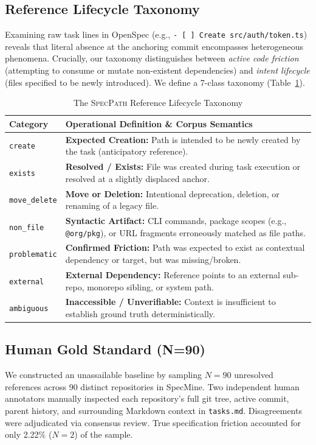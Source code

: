 \documentclass[10pt,conference]{IEEEtran}
\begin{document}
\subsection{Reference Lifecycle Taxonomy}
Examining raw task lines in OpenSpec (e.g., \texttt{- [ ] Create src/auth/token.ts}) reveals that literal absence at the anchoring commit encompasses heterogeneous phenomena. Crucially, our taxonomy distinguishes between \textit{active code friction} (attempting to consume or mutate non-existent dependencies) and \textit{intent lifecycle} (files specified to be newly introduced). We define a 7-class taxonomy (Table~\ref{tab:taxonomy}).

\begin{table}[t]
\caption{The \textsc{SpecPath} Reference Lifecycle Taxonomy}
\label{tab:taxonomy}
\centering
\scriptsize
\begin{tabular}{lp{5.4cm}}
\toprule
\textbf{Category} & \textbf{Operational Definition \& Corpus Semantics} \\
\midrule
\texttt{create} & \textbf{Expected Creation:} Path is intended to be newly created by the task (anticipatory reference). \\
\texttt{exists} & \textbf{Resolved / Exists:} File was created during task execution or resolved at a slightly displaced anchor. \\
\texttt{move\_delete} & \textbf{Move or Deletion:} Intentional deprecation, deletion, or renaming of a legacy file. \\
\texttt{non\_file} & \textbf{Syntactic Artifact:} CLI commands, package scopes (e.g., \texttt{@org/pkg}), or URL fragments erroneously matched as file paths. \\
\texttt{problematic} & \textbf{Confirmed Friction:} Path was expected to exist as contextual dependency or target, but was missing/broken. \\
\texttt{external} & \textbf{External Dependency:} Reference points to an external sub-repo, monorepo sibling, or system path. \\
\texttt{ambiguous} & \textbf{Inaccessible / Unverifiable:} Context is insufficient to establish ground truth deterministically. \\
\bottomrule
\end{tabular}
\end{table}

\subsection{Human Gold Standard (N=90)}
We constructed an unassailable baseline by sampling $N=90$ unresolved references across 90 distinct repositories in SpecMine. Two independent human annotators manually inspected each repository's full git tree, active commit, parent history, and surrounding Markdown context in \texttt{tasks.md}. Disagreements were adjudicated via consensus review. True specification friction accounted for only 2.22\% ($N=2$) of the sample.
\end{document}
